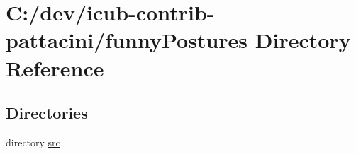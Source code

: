 \section{C\+:/dev/icub-\/contrib-\/pattacini/funny\+Postures Directory Reference}
\label{dir_7e9160af4e981a574624846b1a8444dc}
\subsection*{Directories}
\begin{DoxyCompactItemize}
\item 
directory \hyperlink{dir_d171c69592dbdc36f8589373554bdacf}{src}
\end{DoxyCompactItemize}
